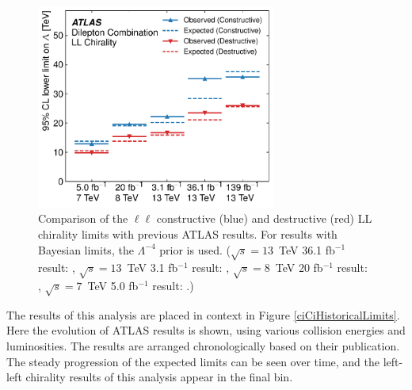 \begin{figure}[h!]
\centering
\includegraphics[width=0.70\textwidth]{figures/ci/results/figaux_05.pdf}
\caption{Comparison of the $\ell\ell$ constructive (blue) and destructive (red) LL chirality limits with previous ATLAS results. For results with Bayesian limits, the $\Lambda^{-4}$ prior is used. ($\sqrt{s}=13$~TeV 36.1 fb$^{-1}$ result: \cite{EXOT-2016-05}, $\sqrt{s}=13$~TeV 3.1 fb$^{-1}$ result: \cite{EXOT-2015-07}, $\sqrt{s}=8$~TeV 20 fb$^{-1}$ result: \cite{EXOT-2013-19}, $\sqrt{s}=7$~TeV 5.0 fb$^{-1}$ result: \cite{EXOT-2012-17}.)}
\label{fig:ciCiHistoricalLimits}
\end{figure}

The results of this analysis are placed in context in Figure \ref{ciCiHistoricalLimits}.
Here the evolution of ATLAS results is shown, using various collision energies and luminosities.
The results are arranged chronologically based on their publication.
The steady progression of the expected limits can be seen over time, and the left-left chirality results of this analysis appear in the final bin.


